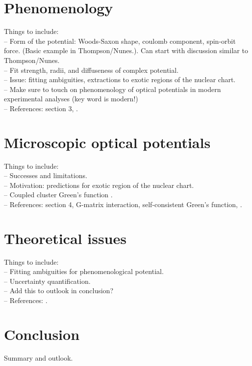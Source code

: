 \documentclass[preprintnumbers,floatfix,aps,prc,preprint,nofootinbib]{revtex4-1}
\begin{document}
\section{Phenomenology}
\label{sec:phenomenology}


Things to include:
\\
-- Form of the potential: Woods-Saxon shape, coulomb component, spin-orbit force. (Basic example in Thompson/Nunes.). Can start with discussion similar to Thompson/Nunes.
\\
-- Fit strength, radii, and diffuseness of complex potential.
\\
-- Issue: fitting ambiguities, extractions to exotic regions of the nuclear chart.
\\
-- Make sure to touch on phenomenology of optical potentials in modern experimental analyses (key word is modern!)
\\
-- References: \cite{Dickhoff:2018wdd} section 3, \cite{Koning:2003zz}.



\section{Microscopic optical potentials}
\label{sec:microscopic}


Things to include:
\\
-- Successes and limitations.
\\
-- Motivation: predictions for exotic region of the nuclear chart.
\\
-- Coupled cluster Green's function \cite{Rotureau:2016jpf}.
\\
-- References: \cite{Dickhoff:2018wdd} section 4, \cite{Furumoto:2019anr} G-matrix interaction, \cite{Idini:2019hkq} self-consistent Green's function, \cite{Rotureau:2016jpf}.


\section{Theoretical issues}
\label{sec:section_4}


Things to include:
\\
-- Fitting ambiguities for phenomenological potential.
\\
-- Uncertainty quantification.
\\
-- Add this to outlook in conclusion?
\\
-- References: \cite{King:2018vzw}.


\section{Conclusion}
\label{sec:conclusion}


Summary and outlook.





\end{document}
